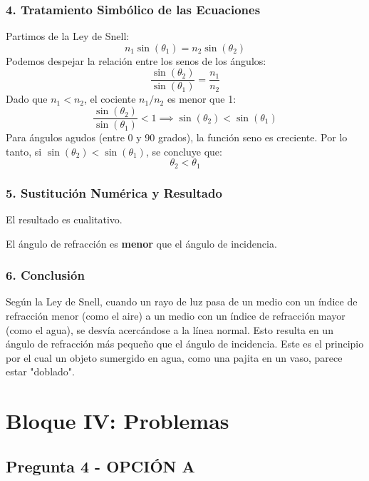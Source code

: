 \subsubsection*{4. Tratamiento Simbólico de las Ecuaciones}
Partimos de la Ley de Snell:
$$ n_1 \sin(\theta_1) = n_2 \sin(\theta_2) $$
Podemos despejar la relación entre los senos de los ángulos:
$$ \frac{\sin(\theta_2)}{\sin(\theta_1)} = \frac{n_1}{n_2} $$
Dado que $n_1 < n_2$, el cociente $n_1/n_2$ es menor que 1:
$$ \frac{\sin(\theta_2)}{\sin(\theta_1)} < 1 \implies \sin(\theta_2) < \sin(\theta_1) $$
Para ángulos agudos (entre 0 y 90 grados), la función seno es creciente. Por lo tanto, si $\sin(\theta_2) < \sin(\theta_1)$, se concluye que:
$$ \theta_2 < \theta_1 $$

\subsubsection*{5. Sustitución Numérica y Resultado}
El resultado es cualitativo.
\begin{cajaresultado}
El ángulo de refracción es \textbf{menor} que el ángulo de incidencia.
\end{cajaresultado}

\subsubsection*{6. Conclusión}
\begin{cajaconclusion}
Según la Ley de Snell, cuando un rayo de luz pasa de un medio con un índice de refracción menor (como el aire) a un medio con un índice de refracción mayor (como el agua), se desvía acercándose a la línea normal. Esto resulta en un ángulo de refracción más pequeño que el ángulo de incidencia. Este es el principio por el cual un objeto sumergido en agua, como una pajita en un vaso, parece estar "doblado".
\end{cajaconclusion}

\newpage

\section{Bloque IV: Problemas}
\label{sec:em_2006_sep}

\subsection{Pregunta 4 - OPCIÓN A}
\label{subsec:4A_2006_sep}

